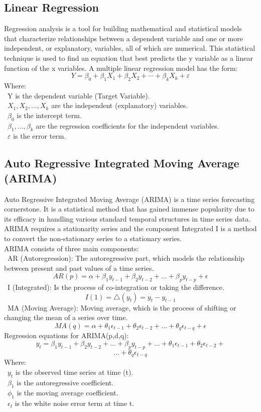 \documentclass{ieeeojies}
\begin{document}
\subsection{Linear Regression}
Regression analysis is a tool for building mathematical and statistical models that characterize relationships between a dependent variable and one or more independent, or explanatory, variables, all of which are numerical. This statistical technique is used to find an equation that best predicts the y variable as a linear function of the x variables.
A multiple linear regression model has the form: 
\[Y=\beta_0+\beta_1X_1+\beta_2X_2+\cdots+\beta_kX_k+\varepsilon\]
Where:\\
	\indent\textbullet\ Y is the dependent variable (Target Variable).\\
	\indent\textbullet\ \(X_1, X_2, \ldots, X_k\) are the independent (explanatory) variables.\\
	\indent\textbullet\ \(\beta_0\) is the intercept term.\\
	\indent\textbullet\ \(\beta_1,..., \beta_k\) are the regression coefficients for the independent variables.\\
	\indent\textbullet\ \(\varepsilon\) is the error term.
 
\subsection{Auto Regressive Integrated Moving Average (ARIMA)}
Auto Regressive Integrated Moving Average (ARIMA) is a time series forecasting cornerstone. It is a statistical method that has gained immense popularity due to its efficacy in handling various standard temporal structures in time series data. ARIMA requires a stationarity series and the component Integrated I is a method to convert the non-stationary series to a stationary series.
\\ARIMA consists of three main components:\\
\indent\textbullet\ AR (Autoregression): The autoregressive part, which models the relationship between present and past values of a time series.
\[AR(p)=\alpha+\beta_1 y_{t-1}+\beta_2 y_{t-2}+...+\beta_p y_{t-p}+\epsilon\]
\indent\textbullet\ I (Integrated): Is the process of co-integration or taking the difference.
\[I(1)=\bigtriangleup (y_t)=y_t-y_{t-1}\]
\indent\textbullet\ MA (Moving Average): Moving average, which is the process of shifting or changing the mean of a series over time.
\[MA(q)=\alpha+\theta_1 \epsilon_{t-1}+\theta_2 \epsilon_{t-2}+...+\theta_q \epsilon_{t-q}+\epsilon\]
Regression equations for ARIMA(p,d,q):
\[y_t=\beta_1 y_{t-1}+\beta_2 y_{t-2}+...+\beta_p y_{t-p}+...+\theta_1 \epsilon_{t-1}+\theta_2 \epsilon_{t-2}+\]\[...+\theta_q \epsilon_{t-q}\]
Where:\\
	\indent\textbullet\ \(y_t\) is the observed time series at time (t).\\
        \indent\textbullet\ \(\beta_1\) is the autoregressive coefficient.\\
        \indent\textbullet\ \(\phi_1\) is the moving average coefficient.\\
        \indent\textbullet\ \(\epsilon_t\)  is the white noise error term at time t.
\end{document}
